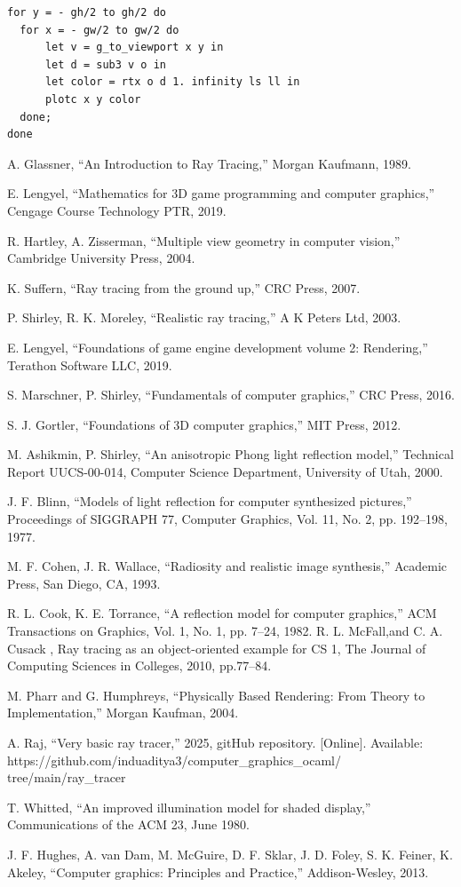 \documentclass[conference]{IEEEtran}
\begin{document}
\begin{lstlisting}
for y = - gh/2 to gh/2 do 
  for x = - gw/2 to gw/2 do 
      let v = g_to_viewport x y in
      let d = sub3 v o in
      let color = rtx o d 1. infinity ls ll in 
      plotc x y color
  done;
done
\end{lstlisting}
\begin{thebibliography}{00}
 A. Glassner, ``An Introduction to Ray Tracing,'' Morgan Kaufmann, 1989.

 E. Lengyel, ``Mathematics for 3D game programming and computer graphics,'' Cengage Course Technology PTR, 2019.

 R. Hartley, A. Zisserman, ``Multiple view geometry in computer vision,'' Cambridge University Press, 2004.

 K. Suffern, ``Ray tracing from the ground up,'' CRC Press, 2007.

 P. Shirley, R. K. Moreley, ``Realistic ray tracing,'' A K Peters Ltd, 2003.

 E. Lengyel, ``Foundations of game engine development volume 2: Rendering,'' Terathon Software LLC, 2019.

 S. Marschner, P. Shirley, ``Fundamentals of computer graphics,'' CRC Press, 2016.

 S. J. Gortler, ``Foundations of 3D computer graphics,'' MIT Press, 2012.

 M. Ashikmin, P. Shirley, ``An anisotropic Phong light reflection model,'' Technical Report UUCS-00-014, Computer Science Department, University of Utah, 2000.

 J. F. Blinn, ``Models of light reflection for computer synthesized pictures,'' Proceedings of SIGGRAPH 77, Computer Graphics, Vol. 11, No. 2, pp. 192–198, 1977.

 M. F. Cohen, J. R. Wallace, ``Radiosity and realistic image synthesis,'' Academic Press, San Diego, CA, 1993.

 R. L. Cook, K. E. Torrance, ``A reflection model for computer graphics,'' ACM Transactions on Graphics, Vol. 1, No. 1, pp. 7–24, 1982.
 R. L. McFall,and C. A. Cusack , Ray tracing as an object-oriented example for CS 1, The Journal of Computing Sciences in Colleges, 2010, pp.77--84.

 M. Pharr and G. Humphreys, ``Physically Based Rendering: From Theory to Implementation,'' Morgan Kaufman, 2004.


 A. Raj, ``Very basic ray tracer,'' 2025, gitHub repository. [Online]. Available: https://github.com/induaditya3/computer\_graphics\_ocaml/\\tree/main/ray\_tracer


 T. Whitted, ``An improved illumination model for shaded display,'' Communications of the ACM 23, June 1980.

 J. F. Hughes, A. van Dam, M. McGuire, D. F. Sklar, J. D. Foley, S. K. Feiner, K. Akeley, ``Computer graphics: Principles and Practice,'' Addison-Wesley, 2013.
\end{thebibliography}
\end{document}
